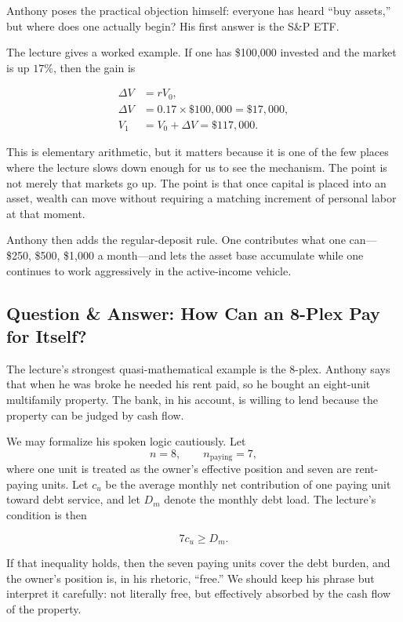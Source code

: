 Anthony poses the practical objection himself: everyone has heard ``buy assets,'' but where does one actually begin? His first answer is the S\&P ETF.

The lecture gives a worked example. If one has \$100{,}000 invested and the market is up \(17\%\), then the gain is

\begin{align}
\Delta V &= rV_0,\\
\Delta V &= 0.17 \times \$100{,}000 = \$17{,}000,\\
V_1 &= V_0 + \Delta V = \$117{,}000.
\end{align}

This is elementary arithmetic, but it matters because it is one of the few places where the lecture slows down enough for us to see the mechanism. The point is not merely that markets go up. The point is that once capital is placed into an asset, wealth can move without requiring a matching increment of personal labor at that moment.

Anthony then adds the regular-deposit rule. One contributes what one can---\$250, \$500, \$1{,}000 a month---and lets the asset base accumulate while one continues to work aggressively in the active-income vehicle.

\subsection{Question \& Answer: How Can an 8-Plex Pay for Itself?}

The lecture's strongest quasi-mathematical example is the 8-plex. Anthony says that when he was broke he needed his rent paid, so he bought an eight-unit multifamily property. The bank, in his account, is willing to lend because the property can be judged by cash flow.

We may formalize his spoken logic cautiously. Let
\[
n=8,\qquad n_{\mathrm{paying}}=7,
\]
where one unit is treated as the owner's effective position and seven are rent-paying units. Let \(c_u\) be the average monthly net contribution of one paying unit toward debt service, and let \(D_m\) denote the monthly debt load. The lecture's condition is then

\begin{equation}
7c_u \ge D_m.
\end{equation}

If that inequality holds, then the seven paying units cover the debt burden, and the owner's position is, in his rhetoric, ``free.'' We should keep his phrase but interpret it carefully: not literally free, but effectively absorbed by the cash flow of the property.

